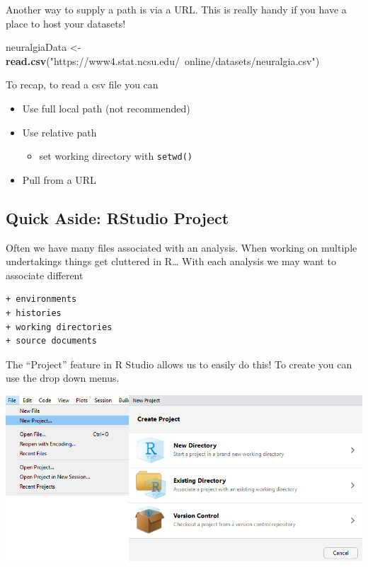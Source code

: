 \documentclass[
]{book}
\newenvironment{Shaded}{\begin{snugshade}}{\end{snugshade}}
\newcommand{\KeywordTok}[1]{\textcolor[rgb]{0.13,0.29,0.53}{\textbf{#1}}}
\newcommand{\NormalTok}[1]{#1}
\newcommand{\StringTok}[1]{\textcolor[rgb]{0.31,0.60,0.02}{#1}}
\providecommand{\tightlist}{%
  \setlength{\itemsep}{0pt}\setlength{\parskip}{0pt}}
\theoremstyle{definition}
\theoremstyle{definition}
\theoremstyle{definition}
\theoremstyle{remark}
\begin{document}
Another way to supply a path is via a URL. This is really handy if you have a place to host your datasets!

\begin{Shaded}
\begin{Highlighting}[]
\NormalTok{neuralgiaData <-}\StringTok{ }\KeywordTok{read.csv}\NormalTok{(}\StringTok{"https://www4.stat.ncsu.edu/~online/datasets/neuralgia.csv"}\NormalTok{)}
\end{Highlighting}
\end{Shaded}

To recap, to read a csv file you can

\begin{itemize}
\item
  Use full local path (not recommended)
\item
  Use relative path

  \begin{itemize}
  \tightlist
  \item
    set working directory with \texttt{setwd()}
  \end{itemize}
\item
  Pull from a URL
\end{itemize}

\hypertarget{quick-aside-rstudio-project-1}{%
\subsection{Quick Aside: RStudio Project}\label{quick-aside-rstudio-project-1}}

Often we have many files associated with an analysis. When working on multiple undertakings things get cluttered in R\ldots{} With each analysis we may want to associate different

\begin{verbatim}
+ environments  
+ histories  
+ working directories  
+ source documents  
\end{verbatim}

The ``Project'' feature in R Studio allows us to easily do this! To create you can use the drop down menus.

\begin{center}\includegraphics[width=0.8\linewidth]{img/project} \end{center}
\end{document}
